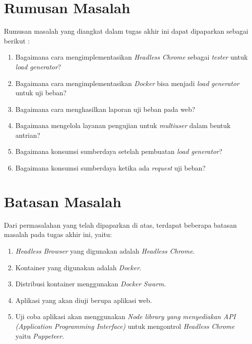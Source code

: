 	\section{Rumusan Masalah}
       	Rumusan masalah yang diangkat dalam tugas akhir ini dapat dipaparkan sebagai berikut :
		\begin{enumerate}
			\item Bagaimana cara mengimplementasikan \textit{Headless Chrome} sebagai \textit{tester} untuk \textit{load generator}?
			\item Bagaimana cara mengimplementasikan \textit{Docker} bisa menjadi \textit{load generator} untuk uji beban?
			\item Bagaimana cara menghasilkan laporan uji beban pada web?
			\item Bagaimana mengelola layanan pengujian untuk \textit{multiuser} dalam bentuk antrian?
			\item Bagaimana konsumsi sumberdaya setelah pembuatan \textit{load generator}?
			\item Bagaimana konsumsi sumberdaya ketika ada \textit{request} uji beban?
		\end{enumerate}

	\section{Batasan Masalah}
		Dari permasalahan yang telah dipaparkan di atas, terdapat beberapa batasan masalah pada tugas akhir ini, yaitu:
		\begin{enumerate}
			\item \textit{Headless Browser} yang digunakan adalah \textit{Headless Chrome}.
			\item Kontainer yang digunakan adalah \textit{Docker}.
			\item Distribusi kontainer menggunakan \textit{Docker Swarm}.
			\item Aplikasi yang akan diuji berupa aplikasi web.
			\item Uji coba aplikasi akan menggunakan  \textit{Node library yang menyediakan API (Application Programming Interface)} untuk mengontrol \textit{Headless Chrome} yaitu \textit{Puppeteer}.
		\end{enumerate}

